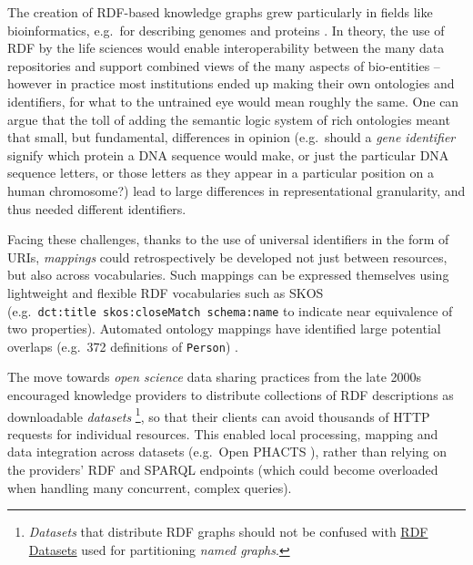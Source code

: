 \documentclass[fleqn,10pt,lineno]{wlpeerj}
\begin{document}
The creation of RDF-based knowledge graphs grew particularly in fields like bioinformatics, e.g.~for describing genomes and proteins \cite{bMSxa8XW,Qlrlr2TZ}. In theory, the use of RDF by the life sciences would enable interoperability between the many data repositories and support combined views of the many aspects of bio-entities -- however in practice most institutions ended up making their own ontologies and identifiers, for what to the untrained eye would mean roughly the same. One can argue that the toll of adding the semantic logic system of rich ontologies meant that small, but fundamental, differences in opinion (e.g.~should a \emph{gene identifier} signify which protein a DNA sequence would make, or just the particular DNA sequence letters, or those letters as they appear in a particular position on a human chromosome?) lead to large differences in representational granularity, and thus needed different identifiers.

Facing these challenges, thanks to the use of universal identifiers in the form of URIs, \emph{mappings} could retrospectively be developed not just between resources, but also across vocabularies. Such mappings can be expressed themselves using lightweight and flexible RDF vocabularies such as SKOS \cite{15gQDya5B} (e.g.~\texttt{dct:title\ skos:closeMatch\ schema:name} to indicate near equivalence of two properties). Automated ontology mappings have identified large potential overlaps (e.g.~372 definitions of \texttt{Person}) \cite{FDDmgO6s} .

The move towards \emph{open science} data sharing practices from the late 2000s encouraged knowledge providers to distribute collections of RDF descriptions as downloadable \emph{datasets} \footnote{\emph{Datasets} that distribute RDF graphs should not be confused with \href{https://www.w3.org/TR/rdf11-concepts/\#section-dataset}{RDF Datasets} used for partitioning \emph{named graphs}.}, so that their clients can avoid thousands of HTTP requests for individual resources. This enabled local processing, mapping and data integration across datasets (e.g.~Open PHACTS \cite{191ZkYZMt}), rather than relying on the providers' RDF and SPARQL endpoints (which could become overloaded when handling many concurrent, complex queries).
\end{document}
